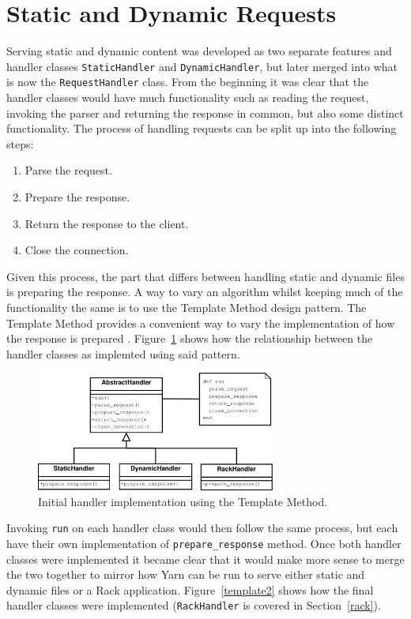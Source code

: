 \section{Static and Dynamic Requests}
Serving static and dynamic content was developed as two separate features and
handler classes \texttt{StaticHandler} and \texttt{DynamicHandler}, but
later merged into what is now the \texttt{RequestHandler} class. From the
beginning it was clear that the handler classes would have much functionality
such as reading the request, invoking the parser and returning the response in
common, but also some distinct functionality. The process of handling requests can be split up into
the following steps:

\begin{enumerate}
  \item Parse the request.
  \item Prepare the response.
  \item Return the response to the client.
  \item Close the connection.
\end{enumerate}

Given this process, the part that differs between handling static and dynamic
files is preparing the response. 
 A way to vary an algorithm
whilst keeping much of the functionality the same is to use the Template
Method design pattern.
The Template Method provides a
convenient way to vary the implementation of how the response is prepared
\cite{design_patterns}.  Figure~\ref{template} shows how the relationship
between the handler classes as implemted using said pattern.

\begin{figure}[htb]
  \centering
  \includegraphics[width=0.7\textwidth]{diagrams/handlers.pdf}
  \caption{Initial handler implementation using the Template Method.}
  \label{template}
\end{figure}

Invoking \texttt{run} on each handler class would then follow the same process, but
each have their own implementation of \texttt{prepare\_response} method. Once
both handler classes were implemented it became clear that it would make more
sense to merge the two together to mirror how Yarn can be run to serve either
static and dynamic files or a Rack application. Figure~\ref{template2} shows
how the final handler classes were implemented (\texttt{RackHandler} is
covered in Section~\ref{rack}).

